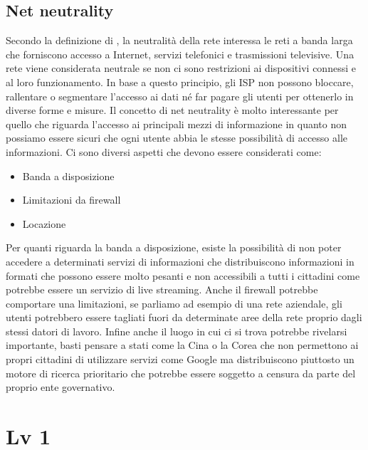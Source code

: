 \documentclass{article}
\begin{document}
\subsection{Net neutrality}
Secondo la definizione di \cite{crowcroft2007net}, la neutralità della rete interessa le reti a banda larga che forniscono accesso a Internet, servizi telefonici e trasmissioni televisive. Una rete viene considerata neutrale se non ci sono restrizioni ai dispositivi connessi e al loro funzionamento. In base a questo principio, gli ISP non possono bloccare, rallentare o segmentare l’accesso ai dati né far pagare gli utenti per ottenerlo in diverse forme e misure.
Il concetto di net neutrality è molto interessante per quello che riguarda l'accesso ai principali mezzi di informazione in quanto non possiamo essere sicuri che ogni utente abbia le stesse possibilità di accesso alle informazioni.
Ci sono diversi aspetti che devono essere considerati come:
\begin{itemize}
    \item Banda a disposizione
    \item Limitazioni da firewall
    \item Locazione
\end{itemize}
Per quanti riguarda la banda a disposizione, esiste la possibilità di non poter accedere a determinati servizi di informazioni che distribuiscono informazioni in formati che possono essere molto pesanti e non accessibili a tutti i cittadini come potrebbe essere un servizio di live streaming.
Anche il firewall potrebbe comportare una limitazioni, se parliamo ad esempio di una rete aziendale, gli utenti potrebbero essere tagliati fuori da determinate aree della rete proprio dagli stessi datori di lavoro.
Infine anche il luogo in cui ci si trova potrebbe rivelarsi importante, basti pensare a stati come la Cina o la Corea che non permettono ai propri cittadini di utilizzare servizi come Google ma distribuiscono piuttosto un motore di ricerca prioritario che potrebbe essere soggetto a censura da parte del proprio ente governativo.
\section{Lv 1}
\end{document}
